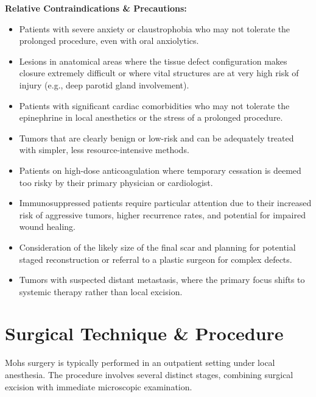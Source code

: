 \textbf{Relative Contraindications \& Precautions:}
\begin{itemize}
  \item Patients with severe anxiety or claustrophobia who may not tolerate the prolonged procedure, even with oral anxiolytics.
  
  \item Lesions in anatomical areas where the tissue defect configuration makes closure extremely difficult or where vital structures are at very high risk of injury (e.g., deep parotid gland involvement).
  
  \item Patients with significant cardiac comorbidities who may not tolerate the epinephrine in local anesthetics or the stress of a prolonged procedure.
  
  \item Tumors that are clearly benign or low-risk and can be adequately treated with simpler, less resource-intensive methods.
  
  \item Patients on high-dose anticoagulation where temporary cessation is deemed too risky by their primary physician or cardiologist.
  
  \item Immunosuppressed patients require particular attention due to their increased risk of aggressive tumors, higher recurrence rates, and potential for impaired wound healing.
  
  \item Consideration of the likely size of the final scar and planning for potential staged reconstruction or referral to a plastic surgeon for complex defects.
  
  \item Tumors with suspected distant metastasis, where the primary focus shifts to systemic therapy rather than local excision.
\end{itemize}

\section*{Surgical Technique \& Procedure}
Mohs surgery is typically performed in an outpatient setting under local anesthesia. The procedure involves several distinct stages, combining surgical excision with immediate microscopic examination.

